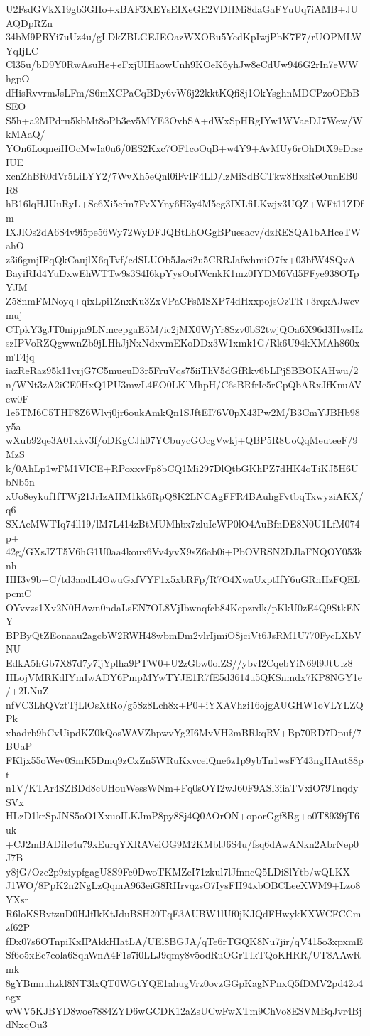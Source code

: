 U2FsdGVkX19gb3GHo+xBAF3XEYsEIXeGE2VDHMi8daGaFYuUq7iAMB+JUAQDpRZn
34bM9PRYi7uUz4u/gLDkZBLGEJEOazWXOBu5YcdKpIwjPbK7F7/rUOPMLWYqIjLC
Cl35u/bD9Y0RwAsuHe+eFxjUIHaowUnh9KOeK6yhJw8eCdUw946G2rIn7eWWhgpO
dHisRvvrmJsLFm/S6mXCPaCqBDy6vW6j22kktKQfi8j1OkYsghnMDCPzoOEbBSEO
S5h+a2MPdru5kbMt8oPb3ev5MYE3OvhSA+dWxSpHRgIYw1WVaeDJ7Wew/WkMAaQ/
YOn6LoqneiHOcMwIa0u6/0ES2Kxc7OF1coOqB+w4Y9+AvMUy6rOhDtX9eDrseIUE
xcnZhBR0dVr5LiLYY2/7WvXh5eQnl0iFvIF4LD/lzMiSdBCTkw8HxsReOunEB0R8
hB16lqHJUuRyL+Sc6Xi5efm7FvXYny6H3y4M5eg3IXLfiLKwjx3UQZ+WFt11ZDfm
IXJlOs2dA6S4v9i5pe56Wy72WyDFJQBtLhOGgBPuesacv/dzRESQA1bAHceTWahO
z3i6gmjIFqQkCaujlX6qTvf/cdSLUOb5Jaci2u5CRRJafwhmiO7fx+03bfW4SQvA
BayiRId4YuDxwEhWTTw9s3S4I6kpYysOoIWcnkK1mz0IYDM6Vd5FFye938OTpYJM
Z58nmFMNoyq+qixLpi1ZnxKu3ZxVPaCFsMSXP74dHxxpojsOzTR+3rqxAJwcvmuj
CTpkY3gJT0nipja9LNmcepgaE5M/ic2jMX0WjYr8Szv0bS2twjQOa6X96d3HwsHz
szIPVoRZQgwwnZb9jLHhJjNxNdxvmEKoDDx3W1xmk1G/Rk6U94kXMAh860xmT4jq
iazReRaz95k11vrjG7C5mueuD3r5FruVqs75iiThV5dGfRkv6bLPjSBBOKAHwu/2
n/WNt3zA2iCE0HxQ1PU3mwL4EO0LKlMhpH/C6sBRfrIc5rCpQbARxJfKnuAVew0F
1e5TM6C5THF8Z6Wlvj0jr6oukAmkQn1SJftEI76V0pX43Pw2M/B3CmYJBHb98y5a
wXub92qe3A01xkv3f/oDKgCJh07YCbuycGOcgVwkj+QBP5R8UoQqMeuteeF/9MzS
k/0AhLp1wFM1VICE+RPoxxvFp8bCQ1Mi297DlQtbGKhPZ7dHK4oTiKJ5H6UbNb5n
xUo8eykuf1fTWj21JrIzAHM1kk6RpQ8K2LNCAgFFR4BAuhgFvtbqTxwyziAKX/q6
SXAeMWTIq74ll19/lM7L414zBtMUMhbx7zluIcWP0lO4AuBfnDE8N0U1LfM074p+
42g/GXsJZT5V6hG1U0aa4koux6Vv4yvX9sZ6ab0i+PbOVRSN2DJlaFNQOY053knh
HH3v9b+C/td3aadL4OwuGxfVYF1x5xbRFp/R7O4XwaUxptIfY6uGRnHzFQELpcmC
OYvvzs1Xv2N0HAwn0ndaLsEN7OL8VjIbwnqfcb84Kepzrdk/pKkU0zE4Q9StkENY
BPByQtZEonaau2agcbW2RWH48wbmDm2vlrIjmiO8jciVt6JsRM1U770FycLXbVNU
EdkA5hGb7X87d7y7ijYplha9PTW0+U2zGbw0olZS//ybvI2CqebYiN69l9JtUlz8
HLojVMRKdIYmIwADY6PmpMYwTYJE1R7fE5d3614u5QKSnmdx7KP8NGY1e/+2LNuZ
nfVC3LhQVztTjLlOsXtRo/g5Sz8Lch8x+P0+iYXAVhzi16ojgAUGHW1oVLYLZQPk
xhadrb9hCvUipdKZ0kQosWAVZhpwvYg2I6MvVH2mBRkqRV+Bp70RD7Dpuf/7BUaP
FKljx55oWev0SmK5Dmq9zCxZn5WRuKxvceiQne6z1p9ybTn1wsFY43ngHAut88pt
n1V/KTAr4SZBDd8cUHouWessWNm+Fq0sOYI2wJ60F9ASl3iiaTVxiO79TnqdySVx
HLzD1krSpJNS5oO1XxuoILKJmP8py8Sj4Q0AOrON+oporGgf8Rg+o0T8939jT6uk
+CJ2mBADiIc4u79xEurqYXRAVeiOG9M2KMblJ6S4u/fsq6dAwANkn2AbrNep0J7B
y8jG/Ozc2p9ziypfgagU8S9Fc0DwoTKMZeI71zkul7lJfnncQ5LDiSlYtb/wQLKX
J1WO/8PpK2n2NgLzQqmA963eiG8RHrvqzsO7IysFH94xbOBCLeeXWM9+Lzo8YXsr
R6loKSBvtzuD0HJfIkKtJduBSH20TqE3AUBW1lUf0jKJQdFHwykKXWCFCCmzf62P
fDx07s6OTnpiKxIPAkkHIatLA/UEl8BGJA/qTe6rTGQK8Nu7jir/qV415o3xpxmE
Sf6o5xEc7eola6SqhWnA4F1s7i0LLJ9qmy8v5odRuOGrTlkTQoKHRR/UT8AAwRmk
8gYBmnuhzkl8NT3lxQT0WGtYQE1ahugVrz0ovzGGpKagNPnxQ5fDMV2pd42o4agx
wWV5KJBYD8woe7884ZYD6wGCDK12aZsUCwFwXTm9ChVo8ESVMBqJvr4BjdNxqOu3
